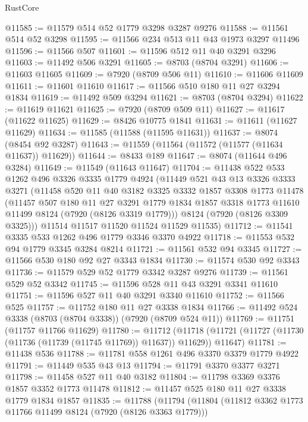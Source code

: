\begin{lexlean}{RustCore}
\begin{coremodule}
@11585 := @11579 @514 @52 @1779 @3298 @3287 @9276
@11588 := @11561 @514 @52 @3298
@11595 := @11566 @234 @513 @11 @43 @1973 @3297 @11496
@11596 := @11566 @507
@11601 := @11596 @512 @11 @40 @3291 @3296
@11603 := @11492 @506 @3291
@11605 := @8703 (@8704 @3291)
@11606 := @11603 @11605
@11609 := @7920 (@8709 @506 @11)
@11610 := @11606 @11609
@11611 := @11601 @11610
@11617 := @11566 @510 @180 @11 @27 @3294 @1834
@11619 := @11492 @509 @3294
@11621 := @8703 (@8704 @3294)
@11622 := @11619 @11621
@11625 := @7920 (@8709 @509 @11)
@11627 := @11617 (@11622 @11625)
@11629 := @8426 @10775 @1841
@11631 := @11611 (@11627 @11629)
@11634 := @11585 (@11588 (@11595 @11631))
@11637 := @8074 (@8454 @92 @3287)
@11643 := @11559 (@11564 (@11572 (@11577 (@11634 @11637)) @11629))
@11644 := @8433 @189
@11647 := @8074 (@11644 @496 @3284)
@11649 := @11549 (@11643 @11647)
@11704 := @11438
    @522
    @533
    @1262
    @496
    @3326
    @3335
    @1779
    @4924
    (@11449
      @521
      @43
      @13
      @3326
      @3333
      @3271
      (@11458
        @520
        @11
        @40
        @3182
        @3325
        @3332
        @1857
        @3308
        @1773
        @11478
        (@11457
          @507
          @180
          @11
          @27
          @3291
          @1779
          @1834
          @1857
          @3318
          @1773
          @11610
          @11499
          @8124
          (@7920 (@8126 @3319 @1779)))
        @8124
        (@7920 (@8126 @3309 @3325)))
      @11514
      @11517
      @11520
      @11524
      @11529
      @11535)
@11712 := @11541 @3335 @533 @1262 @496 @1779 @3346 @3370 @4922
@11718 := @11553 @532 @94 @1779 @3345 @3284 @8214
@11721 := @11561 @532 @94 @3345
@11727 := @11566 @530 @180 @92 @27 @3343 @1834
@11730 := @11574 @530 @92 @3343
@11736 := @11579 @529 @52 @1779 @3342 @3287 @9276
@11739 := @11561 @529 @52 @3342
@11745 := @11596 @528 @11 @43 @3291 @3341 @11610
@11751 := @11596 @527 @11 @40 @3291 @3340 @11610
@11752 := @11566 @525
@11757 := @11752 @180 @11 @27 @3338 @1834
@11766 := @11492 @524 @3338 (@8703 (@8704 @3338)) (@7920 (@8709 @524 @11))
@11769 := @11751 (@11757 @11766 @11629)
@11780 := @11712
    (@11718 (@11721 (@11727 (@11730 (@11736 (@11739 (@11745 @11769)) @11637)) @11629)) @11647)
@11781 := @11438 @536
@11788 := @11781 @558 @1261 @496 @3370 @3379 @1779 @4922
@11791 := @11449 @535 @43 @13
@11794 := @11791 @3370 @3377 @3271
@11798 := @11458 @527 @11 @40 @3182
@11804 := @11798 @3369 @3376 @1857 @3352 @1773 @11478
@11812 := @11457 @525 @180 @11 @27 @3338 @1779 @1834 @1857
@11835 := @11788
    (@11794
      (@11804
        (@11812 @3362 @1773 @11766 @11499 @8124 (@7920 (@8126 @3363 @1779)))

\end{coremodule}
\end{lexlean}
